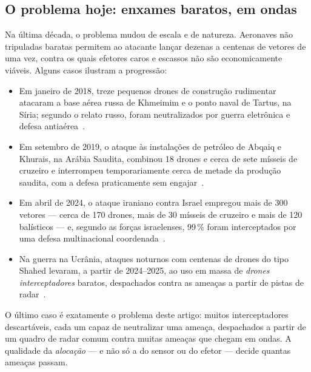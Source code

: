 \documentclass[11pt,a4paper]{article}
\begin{document}
\subsection{O problema hoje: enxames baratos, em ondas}
Na última década, o problema mudou de escala e de natureza. Aeronaves não tripuladas baratas permitem ao atacante
lançar dezenas a centenas de vetores de uma vez, contra os quais efetores caros e escassos não são economicamente
viáveis. Alguns casos ilustram a progressão:
\begin{itemize}
  \item Em janeiro de 2018, treze pequenos drones de construção rudimentar atacaram a base aérea russa de Khmeimim e o
        ponto naval de Tartus, na Síria; segundo o relato russo, foram neutralizados por guerra eletrônica e defesa
        antiaérea~\cite{bellingcat2018}.
  \item Em setembro de 2019, o ataque às instalações de petróleo de Abqaiq e Khurais, na Arábia Saudita, combinou 18
        drones e cerca de sete mísseis de cruzeiro e interrompeu temporariamente cerca de metade da produção saudita, com
        a defesa praticamente sem engajar~\cite{idsa2019}.
  \item Em abril de 2024, o ataque iraniano contra Israel empregou mais de 300 vetores --- cerca de 170 drones, mais de 30
        mísseis de cruzeiro e mais de 120 balísticos --- e, segundo as forças israelenses, 99\,\% foram interceptados por
        uma defesa multinacional coordenada~\cite{pbs2024}.
  \item Na guerra na Ucrânia, ataques noturnos com centenas de drones do tipo Shahed levaram, a partir de 2024--2025, ao
        uso em massa de \emph{drones interceptadores} baratos, despachados contra as ameaças a partir de pistas de
        radar~\cite{pravda2025}.
\end{itemize}
O último caso é exatamente o problema deste artigo: muitos interceptadores descartáveis, cada um capaz de neutralizar uma
ameaça, despachados a partir de um quadro de radar comum contra muitas ameaças que chegam em ondas. A qualidade da
\emph{alocação} --- e não só a do sensor ou do efetor --- decide quantas ameaças passam.
\end{document}
